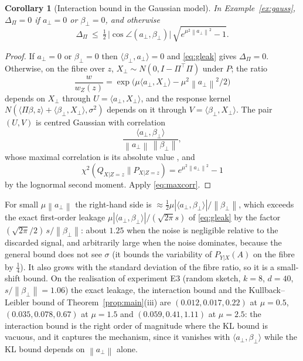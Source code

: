 \documentclass[11pt,a4paper]{article}
\newcommand{\norm}[1]{\left\|#1\right\|}
\theoremstyle{plain}
\newtheorem{corollary}[theorem]{Corollary}
\theoremstyle{definition}
\theoremstyle{remark}
\begin{document}
\begin{corollary}[Interaction bound in the Gaussian model]\label{cor:gaussinter}
In Example~\ref{ex:gauss}, $\Delta_\Pi=0$ if $a_\perp=0$ or $\beta_\perp=0$, and otherwise
\[
\Delta_\Pi\ \le\ \tfrac12\,\bigl|\cos\angle(a_\perp,\beta_\perp)\bigr|\,\sqrt{e^{\mu^2\norm{a_\perp}^2}-1}.
\]
\end{corollary}
\begin{proof}
If $a_\perp=0$ or $\beta_\perp=0$ then $\langle\beta_\perp,a_\perp\rangle=0$ and \eqref{eq:gleak} gives $\Delta_\Pi=0$. Otherwise, on the fibre over $z$, $X_\perp\sim N(0,I-\Pi^{\!\top}\Pi)$ under $P$; the ratio
\[
\frac{w}{w_Z(z)}=\exp\bigl(\mu\langle a_\perp,X_\perp\rangle-\mu^2\norm{a_\perp}^2/2\bigr)
\]
depends on $X_\perp$ through $U=\langle a_\perp,X_\perp\rangle$, and the response kernel $N(\langle\Pi\beta,z\rangle+\langle\beta_\perp,X_\perp\rangle,\sigma^2)$ depends on it through $V=\langle\beta_\perp,X_\perp\rangle$. The pair $(U,V)$ is centred Gaussian with correlation
\[
\frac{\langle a_\perp,\beta_\perp\rangle}{\norm{a_\perp}\,\norm{\beta_\perp}},
\]
whose maximal correlation is its absolute value \cite{lancaster1957}, and
\[
\chi^2(Q_{X|Z=z}\|P_{X|Z=z})=e^{\mu^2\norm{a_\perp}^2}-1
\]
by the lognormal second moment. Apply \eqref{eq:maxcorr}.
\end{proof}

For small $\mu\norm{a_\perp}$ the right-hand side is $\approx\tfrac12\mu|\langle a_\perp,\beta_\perp\rangle|/\norm{\beta_\perp}$, which exceeds the exact first-order leakage $\mu|\langle a_\perp,\beta_\perp\rangle|/(\sqrt{2\pi}s)$ of \eqref{eq:gleak} by the factor $(\sqrt{2\pi}/2)\,s/\norm{\beta_\perp}$: about $1.25$ when the noise is negligible relative to the discarded signal, and arbitrarily large when the noise dominates, because the general bound does not see $\sigma$ (it bounds the variability of $P_{Y|X}(A)$ on the fibre by $\tfrac14$). It also grows with the standard deviation of the fibre ratio, so it is a small-shift bound. On the realisation of experiment E3 (random sketch, $k=8$, $d=40$, $s/\norm{\beta_\perp}=1.06$) the exact leakage, the interaction bound and the Kullback--Leibler bound of Theorem~\ref{prop:main}(iii) are $(0.012,0.017,0.22)$ at $\mu=0.5$, $(0.035,0.078,0.67)$ at $\mu=1.5$ and $(0.059,0.41,1.11)$ at $\mu=2.5$: the interaction bound is the right order of magnitude where the KL bound is vacuous, and it captures the mechanism, since it vanishes with $\langle a_\perp,\beta_\perp\rangle$ while the KL bound depends on $\norm{a_\perp}$ alone.
\end{document}
